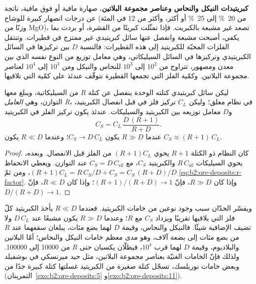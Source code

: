 \textbf{كبريتيدات النيكل والنحاس وعناصر مجموعة البلاتين.} صهارة مافية أو فوق مافية، ناتجة عن درجات انصهار كبيرة
للوشاح (من \qty{20}{\percent} إلى \qty{25}{\percent} أو أكثر، وأكثر من 12 في المئة وزنًا من MgO)،
تصعد غير مشبعة بالكبريت. فإذا تمثّلت كبريتًا من القشرة، أو بردت بما
يكفي، أصبحت مشبعة وانفصل عنها سائل كبريتيدي غير ممتزج في قطيرات. وتنتقل
الفلزات المحبّة للكبريتيد إلى هذه القطيرات: فالنسبة $D$ بين تركيزها في السائل
الكبريتيدي وتركيزها في السائل السيليكاتي، وهي معامل توزيع من النوع نفسه الذي بين
معدن ومصهور، تتراوح من $10^2$ إلى $10^3$ للنحاس والنيكل ومن $10^3$ إلى $10^4$ لعناصر
مجموعة البلاتين. وكمّية الفلز التي تجمعها القطيرة تتوقّف عندئذ على كمّية  التي تلاقيها.

\begin{proposition}[العامل R]\label{prop:b2:ore-deposits:r-factor}
ليكن سائل كبريتيدي كتلته الوحدة ينفصل عن كتلة $R$ من  السيليكاتية، ويبلغ معها التوازن،
وهي \emph{العامل R}، في نظام مغلق؛ وليكن $C_L$ تركيز
فلز في  قبل انفصال الكبريتيد، و$D$ معامل توزيعه بين الكبريتيد
والسيليكات. عندئذ يكون تركيز الفلز في الكبريتيد
\begin{equation}
C_S = C_L\,\frac{D\,(R + 1)}{R + D} .
\label{eq:b2:ore-deposits:r-factor}
\end{equation}
عندما $R \gg D$ يكون $C_S \to D\,C_L$؛ وعندما $R \ll D$ يكون $C_S \approx (R + 1)\,C_L$.
\end{proposition}

\begin{proof}
كان النظام ذو الكتلة $R + 1$ يحوي $(R + 1)C_L$ من الفلز قبل الانفصال. وبعده، يحوي السيليكات
$R\,C_{\mathrm{sil}}$ والكبريتيد $C_S$، مع $C_S = D\,C_{\mathrm{sil}}$ عند التوازن.
ويعطي الانحفاظ $(R + 1)C_L = R\,C_S/D + C_S = C_S\,(R + D)/D$، ومن ثمّ
\eqref{eq:b2:ore-deposits:r-factor}. وإذا كان $R \gg D$، فإنّ $(R + 1)/(R + D) \to 1$؛ وإذا كان $R \ll D$،
فإنّ $D/(R + D) \to 1$.
\end{proof}

ويفسّر الحدّان سبب وجود نوعين من خامات الكبريتيد. فعندما $R \ll D$ يأخذ الكبريتيد
كلّ فلز  التي يلاقيها تقريبًا ويزداد $C_S$ مع $R$؛ وعندما $R \gg D$ يكون
مشبعًا عند $D\,C_L$ ولا تضيف  الإضافية شيئًا. فالنيكل والنحاس، وقيمة $D$ لهما بضع مئات،
يبلغان سقفهما عند $R$ من بضع مئات إلى بضعة آلاف، وهو مدى معظم خامات النيكل والنحاس؛
أمّا البلاتين والبلاديوم، وقيمة $D$ لهما قرب $10^4$، فيظلّان يكسبان حتى $R$ من \num{10000} إلى
\num{100000}. ولذلك فإنّ الخامات الغنيّة بعناصر مجموعة البلاتين، مثل حيد ميرنسكي في بوشفيلد
وبعض خامات نوريلسك، تسجّل كتلة صغيرة من الكبريتيد غسلتها كتلة كبيرة جدًا من
 (التمرينان~\ref{exo:b2:ore-deposits:5} و\ref{exo:b2:ore-deposits:11}).

